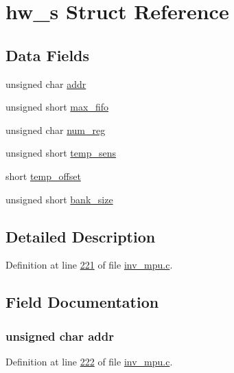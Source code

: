 \hypertarget{structhw__s}{}\section{hw\+\_\+s Struct Reference}
\label{structhw__s}
\subsection*{Data Fields}
\begin{DoxyCompactItemize}
\item 
unsigned char \hyperlink{structhw__s_a4c34a946600e9d68b6355d23f54d291b}{addr}
\item 
unsigned short \hyperlink{structhw__s_a36e9e2aea952cea137504c539cdb97dc}{max\+\_\+fifo}
\item 
unsigned char \hyperlink{structhw__s_a0c4fc172c338358ef1754c16c627eb08}{num\+\_\+reg}
\item 
unsigned short \hyperlink{structhw__s_ab73e7066167ecd424b3a619cddd0939a}{temp\+\_\+sens}
\item 
short \hyperlink{structhw__s_ac3cd6878189d0ca0cb389c5ab11c8395}{temp\+\_\+offset}
\item 
unsigned short \hyperlink{structhw__s_a9e26f1784621a59cabcbfff28dc0b8ba}{bank\+\_\+size}
\end{DoxyCompactItemize}


\subsection{Detailed Description}


Definition at line \hyperlink{inv__mpu_8c_source_l00221}{221} of file \hyperlink{inv__mpu_8c_source}{inv\+\_\+mpu.\+c}.



\subsection{Field Documentation}
\subsubsection[{\texorpdfstring{addr}{addr}}]{\setlength{\rightskip}{0pt plus 5cm}unsigned char addr}\hypertarget{structhw__s_a4c34a946600e9d68b6355d23f54d291b}{}\label{structhw__s_a4c34a946600e9d68b6355d23f54d291b}


Definition at line \hyperlink{inv__mpu_8c_source_l00222}{222} of file \hyperlink{inv__mpu_8c_source}{inv\+\_\+mpu.\+c}.

